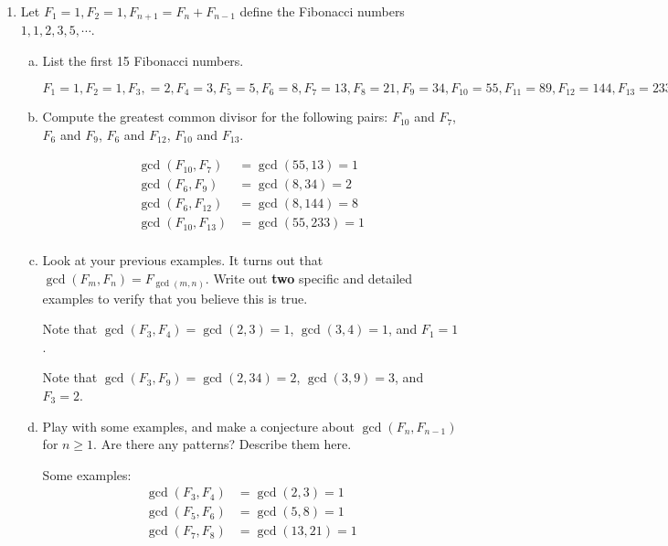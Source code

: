 \documentclass[12pt]{amsart}
\theoremstyle{plain}
\theoremstyle{definition}
\begin{document}
\begin{enumerate}[1.]
	\item Let $F_1 = 1, F_2 = 1, F_{n+1} = F_n + F_{n-1}$ define the Fibonacci numbers $1,1,2,3,5, \cdots$.
		\begin{enumerate}[a.]
			\item List the first 15 Fibonacci numbers.
				\begin{framed}
				$F_1=1, F_2 = 1, F_3, = 2, F_4 = 3, F_5 = 5, F_6 = 8, F_7 = 13, F_8 = 21, F_9 = 34, F_{10} = 55, F_{11} = 89, F_{12} = 144, F_{13} = 233, F_{14} = 377, F_{15} = 610$ 
				\end{framed}
			\item Compute the greatest common divisor for the following pairs: $F_{10}$ and $F_7$, $F_6$ and $F_9$, $F_6$ and $F_{12}$, $F_{10}$ and $F_{13}$.
				\begin{framed}
				\begin{align*}
				\gcd(F_{10},F_{7}) &= \gcd(55,13) = 1\\
				\gcd(F_{6},F_{9}) &= \gcd(8,34) =  2\\
				\gcd(F_{6},F_{12}) &= \gcd(8,144) = 8\\
				\gcd(F_{10},F_{13}) &= \gcd(55,233) = 1\\
				\end{align*}
				\end{framed}
			\item Look at your previous examples. It turns out that $\gcd(F_m,F_n) = F_{\gcd(m,n)}$.  Write out \textbf{two} specific and detailed examples to verify that you believe this is true.
			\begin{framed}
			Note that $\gcd(F_{3},F_{4}) = \gcd(2,3) = 1$, $\gcd(3,4) = 1$, and $F_{1} = 1$.
			\end{framed}
			\begin{framed}
			Note that $\gcd(F_{3},F_{9}) = \gcd(2,34) = 2$, $\gcd(3,9) = 3$, and $F_{3} = 2$.
			\end{framed}
			\item Play with some examples, and make a conjecture about $\gcd(F_n,F_{n-1})$ for $n \geq 1$.  Are there any patterns?  Describe them here.
			\begin{framed}
			Some examples:
			\begin{align*}
				\gcd(F_{3},F_{4}) &= \gcd(2,3) = 1\\
				\gcd(F_{5},F_{6}) &= \gcd(5,8) =  1\\
				\gcd(F_{7},F_{8}) &= \gcd(13,21) = 1\\
				\end{align*}

\end{framed}
\end{enumerate}
\end{enumerate}
\end{document}
